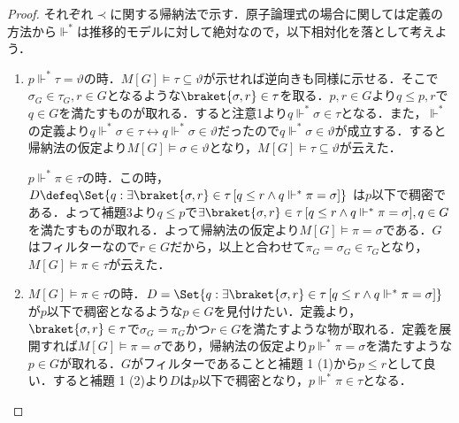 \documentclass[a4j]{ltjsarticle}
\theoremstyle{definition}
\begin{document}
\begin{proof}
 それぞれ$\prec$に関する帰納法で示す．原子論理式の場合に関しては定義の方法から$\mathrel{\Vdash^*}$は推移的モデルに対して絶対なので，以下相対化を落として考えよう．
 \begin{enumerate}[label=(\alph*)]
  \item $p \mathrel{\Vdash^*} \tau =\vartheta$の時．$M[G] \models \tau \subseteq \vartheta$が示せれば逆向きも同様に示せる．そこで$\sigma_G \in \tau_G, r \in G$となるような$\braket{\sigma, r} \in \tau$を取る．$p, r \in G$より$q \leq p, r$で$q \in G$を満たすものが取れる．すると注意1より$q \mathrel{\Vdash^*} \sigma \in \tau$となる．また，$\mathrel{\Vdash^*}$の定義より$q \mathrel{\Vdash^*} \sigma \in \tau \leftrightarrow q \mathrel{\Vdash^*} \sigma \in \vartheta$だったので$q \mathrel{\Vdash^*} \sigma \in  \vartheta$が成立する．すると帰納法の仮定より$M[G] \models \sigma \in \vartheta$となり，$M[G] \models \tau \subseteq \vartheta$が云えた．

	$p \mathrel{\Vdash^*} \pi \in \tau$の時．この時，
	$D \defeq \Set{ q : \exists \braket{\sigma, r} \in \tau \,[q \leq r \wedge q \mathrel{\Vdash^*} \pi = \sigma]}$
	は$p$以下で稠密である．よって補題3より$q \leq p$で$\exists \braket{\sigma, r} \in \tau \,[q \leq r \wedge q \mathrel{\Vdash^*} \pi = \sigma], q \in G$を満たすものが取れる．よって帰納法の仮定より$M[G] \models \pi = \sigma$である．$G$はフィルターなので$r \in G$だから，以上と合わせて$\pi_G = \sigma_G \in \tau_G$となり，$M[G] \models \pi \in \tau$が云えた．
  \item $M[G] \models \pi \in \tau$の時．$D = \Set{ q : \exists \braket{\sigma, r} \in \tau \,[q \leq r \wedge q \mathrel{\Vdash^*} \pi = \sigma]}$が$p$以下で稠密となるような$p \in G$を見付けたい．定義より，$\braket{\sigma, r} \in \tau$で$\sigma_G = \pi_G$かつ$r \in G$を満たすような物が取れる．定義を展開すれば$M[G] \models \pi = \sigma$であり，帰納法の仮定より$p \mathrel{\Vdash^*} \pi = \sigma$を満たすような$p \in G$が取れる．$G$がフィルターであることと補題 1 (1)から$p \leq r$として良い．すると補題 1 (2)より$D$は$p$以下で稠密となり，$p \mathrel{\Vdash^*} \pi \in \tau$となる．


\end{enumerate}
\end{proof}
\end{document}
